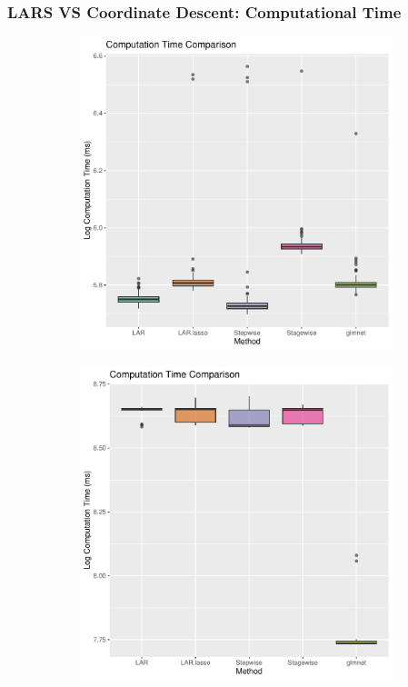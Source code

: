 \begin{frame}
    \frametitle{LARS VS Coordinate Descent: Computational Time}
\begin{figure}[!htbp]
    \begin{subfigure}[t]{0.49\textwidth}
        \centering
        \includegraphics[width=\linewidth]{img/lars_glmnet_time.pdf}
    \end{subfigure}
    \begin{subfigure}[t]{0.49\textwidth}
        \centering
        \includegraphics[width=\linewidth]{img/lars_glmnet_time_large.pdf}

\end{subfigure}
\end{figure}
\end{frame}
